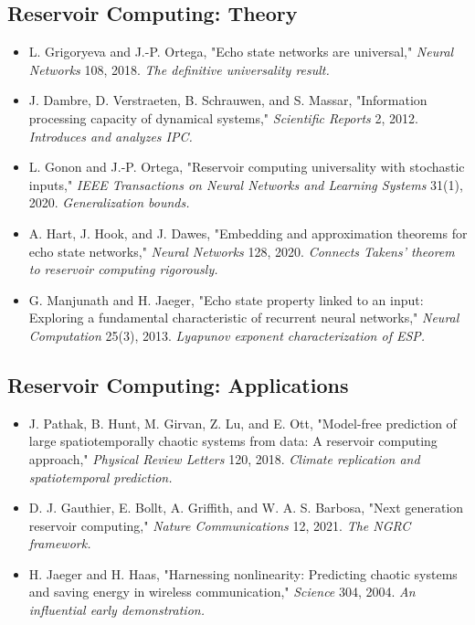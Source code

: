 \subsection{Reservoir Computing: Theory}

\begin{itemize}[nosep]
  \item L. Grigoryeva and J.-P. Ortega, "Echo state networks are universal," \textit{Neural Networks} 108, 2018. \textit{The definitive universality result.}
  \item J. Dambre, D. Verstraeten, B. Schrauwen, and S. Massar, "Information processing capacity of dynamical systems," \textit{Scientific Reports} 2, 2012. \textit{Introduces and analyzes IPC.}
  \item L. Gonon and J.-P. Ortega, "Reservoir computing universality with stochastic inputs," \textit{IEEE Transactions on Neural Networks and Learning Systems} 31(1), 2020. \textit{Generalization bounds.}
  \item A. Hart, J. Hook, and J. Dawes, "Embedding and approximation theorems for echo state networks," \textit{Neural Networks} 128, 2020. \textit{Connects Takens' theorem to reservoir computing rigorously.}
  \item G. Manjunath and H. Jaeger, "Echo state property linked to an input: Exploring a fundamental characteristic of recurrent neural networks," \textit{Neural Computation} 25(3), 2013. \textit{Lyapunov exponent characterization of ESP.}
\end{itemize}

\subsection{Reservoir Computing: Applications}

\begin{itemize}[nosep]
  \item J. Pathak, B. Hunt, M. Girvan, Z. Lu, and E. Ott, "Model-free prediction of large spatiotemporally chaotic systems from data: A reservoir computing approach," \textit{Physical Review Letters} 120, 2018. \textit{Climate replication and spatiotemporal prediction.}
  \item D. J. Gauthier, E. Bollt, A. Griffith, and W. A. S. Barbosa, "Next generation reservoir computing," \textit{Nature Communications} 12, 2021. \textit{The NGRC framework.}
  \item H. Jaeger and H. Haas, "Harnessing nonlinearity: Predicting chaotic systems and saving energy in wireless communication," \textit{Science} 304, 2004. \textit{An influential early demonstration.}
\end{itemize}

